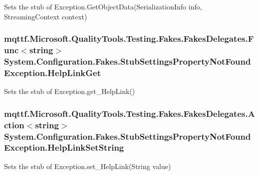Sets the stub of Exception.\-Get\-Object\-Data(\-Serialization\-Info info, Streaming\-Context context)

\hypertarget{class_system_1_1_configuration_1_1_fakes_1_1_stub_settings_property_not_found_exception_a47a6f77e110d10efa90baff7d0ac1626}{
\subsubsection[{Help\-Link\-Get}]{\setlength{\rightskip}{0pt plus 5cm}mqttf.\-Microsoft.\-Quality\-Tools.\-Testing.\-Fakes.\-Fakes\-Delegates.\-Func$<$string$>$ System.\-Configuration.\-Fakes.\-Stub\-Settings\-Property\-Not\-Found\-Exception.\-Help\-Link\-Get}}\label{class_system_1_1_configuration_1_1_fakes_1_1_stub_settings_property_not_found_exception_a47a6f77e110d10efa90baff7d0ac1626}


Sets the stub of Exception.\-get\-\_\-\-Help\-Link()

\hypertarget{class_system_1_1_configuration_1_1_fakes_1_1_stub_settings_property_not_found_exception_a015413139ac82dce7e5c247092af150c}{
\subsubsection[{Help\-Link\-Set\-String}]{\setlength{\rightskip}{0pt plus 5cm}mqttf.\-Microsoft.\-Quality\-Tools.\-Testing.\-Fakes.\-Fakes\-Delegates.\-Action$<$string$>$ System.\-Configuration.\-Fakes.\-Stub\-Settings\-Property\-Not\-Found\-Exception.\-Help\-Link\-Set\-String}}\label{class_system_1_1_configuration_1_1_fakes_1_1_stub_settings_property_not_found_exception_a015413139ac82dce7e5c247092af150c}


Sets the stub of Exception.\-set\-\_\-\-Help\-Link(\-String value)

